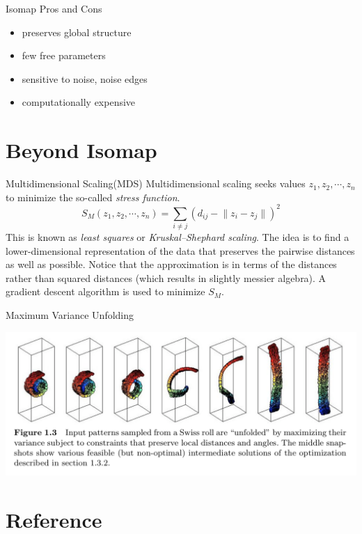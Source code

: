 \documentclass[xcolor={dvipsnames,table}]{beamer}
\begin{document}
\begin{frame}{Isomap Pros and Cons}
	\begin{itemize}
		\item preserves global structure
		\item few free parameters
		\item sensitive to noise, noise edges
		\item computationally expensive
	\end{itemize}
\end{frame}



\section{Beyond Isomap}

\begin{frame}{Multidimensional Scaling(MDS)}
Multidimensional scaling seeks values $z_{1},z_{2}, \cdots, z_{n}$ to minimize the so-called {\em stress function}.
$$
S_M(z_{1},z_{2}, \cdots, z_{n}) =\sum_{i \neq j}(d_{ij}-\lVert z_{i} - z_{j}\rVert)^2
$$
This is known as {\em least squares} or {\em Kruskal–Shephard scaling}. The idea is to find a lower-dimensional representation of the data that preserves the pairwise distances as well as possible. Notice that the approximation is in terms of the distances rather than squared distances (which results in slightly messier algebra). A gradient descent algorithm is used to minimize $S_M$.
	
\end{frame}


\begin{frame}{Maximum Variance Unfolding}
	\begin{center}
     	\includegraphics[width=\linewidth]{MVU.png}
     \end{center}
\end{frame}

\section{Reference}
\end{document}
